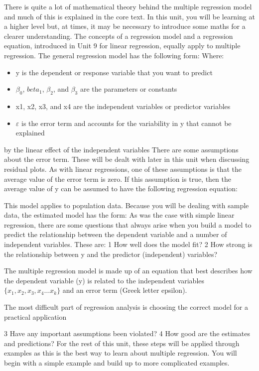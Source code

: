 \documentclass[]{report}
\begin{document}
There is quite a lot of mathematical theory behind the multiple regression model and
much of this is explained in the core text. In this unit, you will be learning at a higher
level but, at times, it may be necessary to introduce some maths for a clearer
understanding.
The concepts of a regression model and a regression equation, introduced in Unit 9 for
linear regression, equally apply to multiple regression.
The general regression model has the following form:
Where:
\begin{itemize}
\item y is the dependent or response variable that you want to predict
\item $\beta_0$, $beta_1$, $\beta_2$, and $\beta_3$ are the parameters or constants
\item x1, x2, x3, and x4 are the independent variables or predictor variables
\item $\varepsilon$ is the error term and accounts for the variability in y that cannot be explained
\end{itemize}
by the linear effect of the independent variables
There are some assumptions about the error term. These will be dealt with later in this
unit when discussing residual plots. As with linear regressions, one of these assumptions
is that the average value of the error term is zero. If this assumption is true, then the
average value of y can be assumed to have the following regression equation:

This model applies to population data. Because you will be dealing with sample data,
the estimated model has the form:
As was the case with simple linear regression, there are some questions that always
arise when you build a model to predict the relationship between the dependent variable
and a number of independent variables. These are:
1 How well does the model fit?
2 How strong is the relationship between y and the predictor (independent)
variables?

The multiple regression model is made up of an equation that best
describes how the dependent variable (y) is related to the independent
variables $\{x_1, x_2, x_3, x_4 \ldots x_k\}$ and an error term (Greek letter epsilon).

The most difficult part of regression analysis is choosing the correct
model for a practical application


3 Have any important assumptions been violated?
4 How good are the estimates and predictions?
For the rest of this unit, these steps will be applied through examples as this is the best
way to learn about multiple regression. You will begin with a simple example and build
up to more complicated examples.
\end{document}

